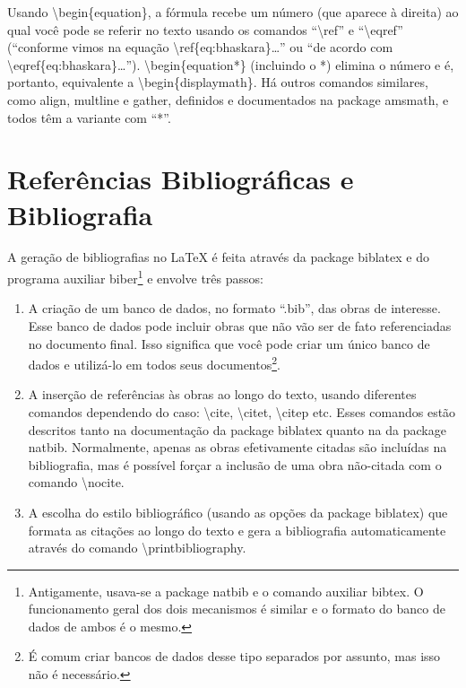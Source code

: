 Usando \textsf{\textbackslash{}begin\{equation\}}, a fórmula recebe um
número (que aparece à direita) ao qual você pode se referir no texto
usando os comandos ``\textsf{\textbackslash{}ref}'' e
``\textsf{\textbackslash{}eqref}'' (``\textsf{conforme vimos na equação
\textbackslash{}ref\{eq:bhaskara\}\ldots}'' ou
``\textsf{de acordo com \textbackslash{}eqref\{eq:bhaskara\}\ldots}'').
\textsf{\textbackslash{}begin\{equation*\}} (incluindo o *) elimina
o número e é, portanto, equivalente a
\textsf{\textbackslash{}begin\{displaymath\}}. Há outros comandos
similares, como \textsf{align}, \textsf{multline} e \textsf{gather},
definidos e documentados na package \textsf{amsmath}, e todos têm
a variante com ``*''.

\section{Referências Bibliográficas e Bibliografia}

A geração de bibliografias no \LaTeX{} é feita através da package
biblatex e do programa auxiliar
biber\footnote{Antigamente, usava-se a package
natbib e o comando auxiliar bibtex. O
funcionamento geral dos dois mecanismos é similar e o formato do banco de
dados de ambos é o mesmo.} e envolve três passos:

\begin{enumerate}
\item A criação de um banco de dados, no formato ``.bib'', das obras de
interesse. Esse banco de dados pode incluir obras que não vão ser de fato
referenciadas no documento final. Isso significa que você pode criar um
único banco de dados e utilizá-lo em todos seus documentos\footnote{É
comum criar bancos de dados desse tipo separados por assunto, mas isso
não é necessário.}.

\item A inserção de referências às obras ao longo do texto, usando
diferentes comandos dependendo do caso: \textsf{\textbackslash{}cite},
\textsf{\textbackslash{}citet}, \textsf{\textbackslash{}citep} etc. Esses
comandos estão descritos tanto na documentação da package
biblatex quanto na da package natbib.
Normalmente, apenas as obras efetivamente citadas são incluídas na
bibliografia, mas é possível forçar a inclusão de uma obra não-citada
com o comando \textsf{\textbackslash{}nocite}.

\item A escolha do estilo bibliográfico (usando as opções da package
biblatex) que formata as citações ao longo do texto e gera a bibliografia
automaticamente através do comando \textsf{\textbackslash{}printbibliography}.
\end{enumerate}

